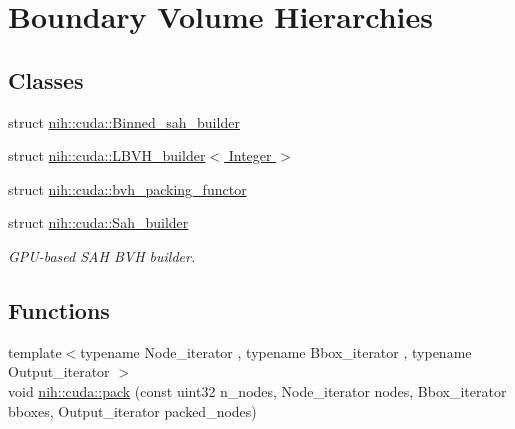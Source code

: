 \hypertarget{group__bvh}{
\section{\-Boundary \-Volume \-Hierarchies}
\label{group__bvh}
}
\subsection*{\-Classes}
\begin{DoxyCompactItemize}
\item 
struct \hyperlink{structnih_1_1cuda_1_1_binned__sah__builder}{nih\-::cuda\-::\-Binned\-\_\-sah\-\_\-builder}
\item 
struct \hyperlink{structnih_1_1cuda_1_1_l_b_v_h__builder}{nih\-::cuda\-::\-L\-B\-V\-H\-\_\-builder$<$ Integer $>$}
\item 
struct \hyperlink{structnih_1_1cuda_1_1bvh__packing__functor}{nih\-::cuda\-::bvh\-\_\-packing\-\_\-functor}
\item 
struct \hyperlink{structnih_1_1cuda_1_1_sah__builder}{nih\-::cuda\-::\-Sah\-\_\-builder}
\begin{DoxyCompactList}\small\item\em \-G\-P\-U-\/based \-S\-A\-H \-B\-V\-H builder. \end{DoxyCompactList}\end{DoxyCompactItemize}
\subsection*{\-Functions}
\begin{DoxyCompactItemize}
\item 
{\footnotesize template$<$typename Node\-\_\-iterator , typename Bbox\-\_\-iterator , typename Output\-\_\-iterator $>$ }\\void \hyperlink{group__bvh_ga6e090f607737d9e380e3f2cc04bca282}{nih\-::cuda\-::pack} (const uint32 n\-\_\-nodes, \-Node\-\_\-iterator nodes, \-Bbox\-\_\-iterator bboxes, \-Output\-\_\-iterator packed\-\_\-nodes)
\end{DoxyCompactItemize}


